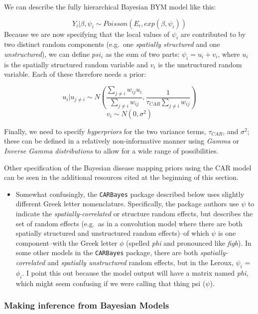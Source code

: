 \documentclass[
]{book}
\newcommand{\passthrough}[1]{#1}
\newenvironment{rmdblock}[1]
  {%
  \begin{itemize}
  \renewcommand{\labelitemi}{
    \raisebox{-.7\height}[0pt][0pt]{
      {\setkeys{Gin}{width=3em,keepaspectratio}\texttt{[image: images/\#1]}}
    }
  }
  \item
  }
  {
  \end{itemize}
  }
\newenvironment{rmdnote}
  {\begin{rmdblock}{note}}
  {\end{rmdblock}}
\begin{document}
We can describe the fully hierarchical Bayesian BYM model like this:

\[Y_i|\beta, \psi_i \sim Poisson(E_i, exp(\beta, \psi_i))\]
Because we are now specifying that the local values of \(\psi_i\) are contributed to by two distinct random components (e.g.~one \emph{spatially structured} and one \emph{unstructured}), we can define \(psi_i\) as the sum of two parts: \(\psi_i = u_i + v_i\), where \(u_i\) is the spatially structured random variable and \(v_i\) is the unstructured random variable. Each of these therefore needs a prior:

\[u_i|u_{j \neq i} \sim N\left(\frac{\sum_{j \neq i} w_{ij}u_i}{\sum_{j \neq i}w_{ij}}, \frac{1}{\tau_{CAR}\sum_{j \neq i}w_{ij}}\right)\]
\[v_i \sim N(0,\sigma^2)\]

Finally, we need to specify \emph{hyperpriors} for the two variance terms, \(\tau_{CAR}\), and \(\sigma^2\); these can be defined in a relatively non-informative manner using \emph{Gamma} or \emph{Inverse Gamma distributions} to allow for a wide range of possibilities.

Other specification of the Bayesian disease mapping priors using the CAR model can be seen in the additional resources cited at the beginning of this section.

\begin{rmdnote}
Somewhat confusingly, the \passthrough{\lstinline!CARBayes!} package described below uses slightly different Greek letter nomenclature. Specifically, the package authors use \(\psi\) to indicate the \emph{spatially-correlated} or structure random effects, but describes the set of random effects (e.g.~as in a convolution model where there are both spatially structured and unstructured random effects)--of which \(\psi\) is one component--with the Greek letter \(\phi\) (spelled \emph{phi} and pronounced like \emph{figh}). In some other models in the \passthrough{\lstinline!CARBayes!} package, there are both \emph{spatially-correlated} and \emph{spatially unstructured} random effects, but in the Leroux, \(\psi_i\) = \(\phi_i\). I point this out because the model output will have a matrix named \emph{phi}, which might seem confusing if we were calling that thing psi (\(\psi\)).
\end{rmdnote}

\hypertarget{making-inference-from-bayesian-models}{%
\subsubsection{Making inference from Bayesian Models}\label{making-inference-from-bayesian-models}}
\end{document}
